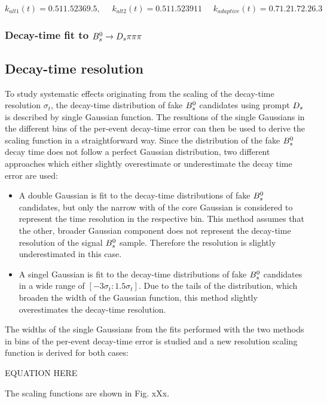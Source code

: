 \[ k_{alt1}(t) =  {0.5 1 1.5 2 3 6 9.5}, \mbox{ } \mbox{ } k_{alt2}(t) =  {0.5  1  1.5  2  3  9 11}  \mbox{ } \mbox{ } k_{adaptive}(t) =  {0.7 1.2 1.7 2.2 6.3} \]





\subsubsection{Decay-time fit to ${{B}^0_{s}}\rightarrow{\ensuremath{{D}_{s}}}{\ensuremath{\pi}}{\ensuremath{\pi}}{\ensuremath{\pi}}$} 






\subsection{Decay-time resolution}

To study systematic effects originating from the scaling of the decay-time resolution $\sigma_{t}$, the decay-time distribution of fake ${{B}^0_{s}}$ candidates using prompt ${{D}_{s}}$ is described by single Gaussian function.
The resultions of the single Gaussians in the different bins of the per-event decay-time error can then be used to derive the scaling function in a straightforward way.
Since the distribution of the fake ${{B}^0_{s}}$ decay time does not follow a perfect Gaussian distribution, two different approaches which either slightly overestimate or underestimate the decay time error are used:

\begin{itemize}

\item A double Gaussian is fit to the decay-time distributions of fake ${{B}^0_{s}}$ candidates, but only the narrow with of the core Gaussian is considered to represent the time resolution in the respective bin. 
This method assumes that the other, broader Gaussian component does not represent the decay-time resolution of the signal ${{B}^0_{s}}$ sample. Therefore the resolution is slightly underestimated in this case.

\item A singel Gaussian is fit to the decay-time distributions of fake ${{B}^0_{s}}$ candidates in a wide range of $[-3\sigma_{t} : 1.5\sigma_{t}]$. 
Due to the tails of the distribution, which broaden the width of the Gaussian function, this method slightly overestimates the decay-time resolution.   

\end{itemize}

The widths of the single Gaussians from the fits performed with the two methods in bins of the per-event decay-time error is studied and a new resolution scaling function is derived for both cases: \newline

EQUATION HERE \newline

The scaling functions are shown in Fig. xXx.


    
